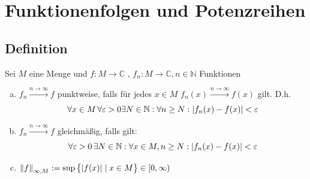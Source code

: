 
\newcommand{\fach}{Analysis \RM{2}}
\newcommand{\semester}{SoSe 2013}
\newcommand{\homepage}{http://wwwmath.uni-muenster.de/u/wilhelm.winter/wwinter/analysis_II.html}
\newcommand{\prof}{Prof.\,Dr.\,Wilhelm Winter}




\maketitle
\begin{abstract}

\end{abstract}

\setcounter{page}{1}
\tableofcontents
\cleardoubleoddemptypage
{}
\setcounter{page}{1}


\section{Funktionenfolgen und Potenzreihen} %
\label{sec:funktionenfolgen_und_potenzreihen}

\subsection[Definition Konvergenz von Funktionenfolgen]{Definition} %
\label{sub:11}
Sei $M$ eine Menge und $f : M \to \mathds{C}$ , $f_n : M \to \mathds{C}, n \in \mathds{N} $ Funktionen 
\begin{enumerate}[a)]
	\item $f_n \xrightarrow{n \to \infty} f$ punktweise, falls für jedes $x \in M$ $f_n(x) \xrightarrow{n \to \infty} f(x)$ gilt. D.h.
	\[
		\forall x \in M \, \forall \varepsilon > 0 \exists N \in \mathbb{N} : \forall n \ge N : \lvert f_n(x) - f(x)\rvert < \varepsilon
	\]
	\item $f_n \xrightarrow{n \to \infty} f$ gleichmäßig, falls gilt: 
	\[
		\forall \varepsilon >0 \, \exists N \in \mathbb{N} : \forall x \in M , n \ge N : \lvert f_n(x) - f(x)\rvert < \varepsilon
	\]
	\item $\norm[\infty, M]{f} := \sup \big\{ \abs{f(x)} \mid x \in M \big\} \in [0, \infty)$
\end{enumerate}

